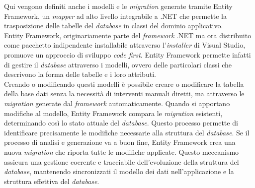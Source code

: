 Qui vengono definiti anche i modelli e le \textit{migration} generate tramite Entity Framework, un 
\textit{mapper} ad alto livello integrabile a .NET che permette la trasposizione delle tabelle del \textit{database} in 
classi del dominio applicativo.\\
Entity Framework, originariamente parte del \textit{framework} .NET ma ora distribuito come pacchetto indipendente 
installabile attraverso l'\textit{installer} di Visual Studio, promuove un approccio di sviluppo \textit{code first}. 
Entity Framework permette infatti di gestire il \textit{database} attraverso i modelli, ovvero delle particolari classi 
che descrivono la forma delle tabelle e i loro attributi.\\
Creando o modificando questi modelli è possibile creare o modificare la tabella della base dati senza la necessità di 
interventi manuali diretti, ma attraverso le \textit{migration} generate dal \textit{framework} automaticamente. 
Quando si apportano modifiche al modello, Entity Framework compara le \textit{migration} esistenti, determinando così 
lo stato attuale del \textit{database}. Questo processo permette di identificare precisamente le modifiche necessarie 
alla struttura del \textit{database}. Se il processo di analisi e generazione va a buon fine, Entity Framework crea 
una nuova \textit{migration} che riporta tutte le modifiche applicate. Questo meccanismo assicura una gestione 
coerente e tracciabile dell'evoluzione della struttura del \textit{database}, mantenendo sincronizzati il modello dei 
dati nell'applicazione e la struttura effettiva del \textit{database}.\\



